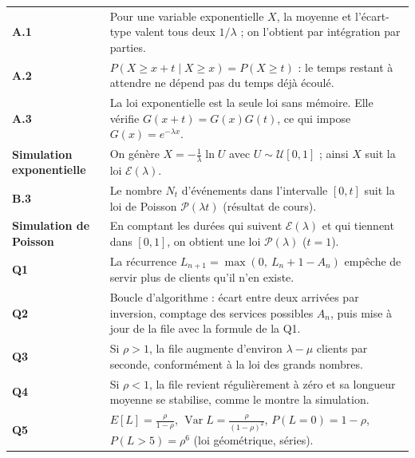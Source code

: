 \documentclass[11pt,a4paper]{article}
\begin{document}
\par\vspace{0.2em}
{\small
\renewcommand{\arraystretch}{1.7}
\begin{tabularx}{\linewidth}{@{}>{\leavevmode\raggedright\color{violet8}\bfseries}p{2.6cm} >{\raggedright\arraybackslash}X@{}}
\toprule
A.1 & Pour une variable exponentielle $X$, la moyenne et l'écart-type valent tous deux $1/\lambda$ ; on l'obtient par intégration par parties. \\
A.2 & $P(X \ge x + t \mid X \ge x) = P(X \ge t)$ : le temps restant à attendre ne dépend pas du temps déjà écoulé. \\
A.3 & La loi exponentielle est la seule loi sans mémoire. Elle vérifie $G(x+t) = G(x)G(t)$, ce qui impose $G(x) = e^{-\lambda x}$. \\
Simulation exponentielle & On génère $X = -\frac{1}{\lambda}\ln U$ avec $U \sim \mathcal U[0, 1]$ ; ainsi $X$ suit la loi $\mathcal E(\lambda)$. \\
B.3 & Le nombre $N_t$ d'événements dans l'intervalle $[0, t]$ suit la loi de Poisson $\mathcal P(\lambda t)$ (résultat de cours). \\
Simulation de Poisson & En comptant les durées qui suivent $\mathcal E(\lambda)$ et qui tiennent dans $[0, 1]$, on obtient une loi $\mathcal P(\lambda)$ ($t = 1$). \\
Q1 & La récurrence $L_{n+1} = \max(0,\ L_n + 1 - A_n)$ empêche de servir plus de clients qu'il n'en existe. \\
Q2 & Boucle d'algorithme : écart entre deux arrivées par inversion, comptage des services possibles $A_n$, puis mise à jour de la file avec la formule de la Q1. \\
Q3 & Si $\rho > 1$, la file augmente d'environ $\lambda - \mu$ clients par seconde, conformément à la loi des grands nombres. \\
Q4 & Si $\rho < 1$, la file revient régulièrement à zéro et sa longueur moyenne se stabilise, comme le montre la simulation. \\
Q5 & $E[L] = \frac{\rho}{1-\rho}$, $\operatorname{Var}L = \frac{\rho}{(1-\rho)^2}$, $P(L = 0) = 1 - \rho$, $P(L > 5) = \rho^6$ (loi géométrique, séries). \\
\bottomrule
\end{tabularx}}
\end{document}
